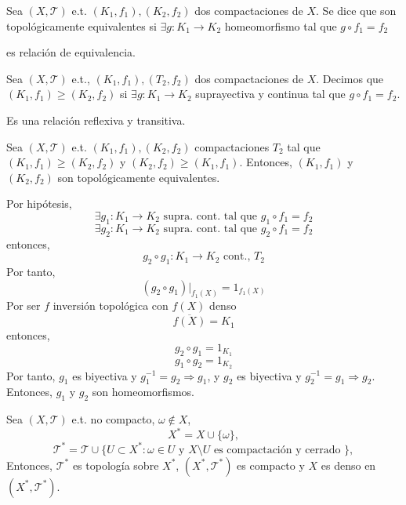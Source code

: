 \begin{defn}
  Sea $( X, \mathcal{T} )$ e.t. $( K_{1}, f_{1} ), ( K_{2}, f_{2} )$ dos compactaciones de $X$. Se dice que son topológicamente equivalentes si $\exists g : K_{1} \to K_{2}$ homeomorfismo tal que $g \circ f_{1} = f_{2}$
\end{defn}

\begin{obs}
  es relación de equivalencia.
\end{obs}

\begin{defn}
  Sea $( X, \mathcal{T} )$ e.t., $( K_{1}, f_{1} ), ( T_{2}, f_{2} )$ dos compactaciones de $X$. Decimos que $( K_{1}, f_{1} ) \geq ( K_{2}, f_{2} )$ si $\exists g : K_{1} \to K_{2}$ suprayectiva y continua tal que $g \circ f_{1} = f_{2}$. 
\end{defn}

\begin{obs}
  Es una relación reflexiva y transitiva.
\end{obs}

\begin{prop}
  Sea $( X, \mathcal{T} )$ e.t. $( K_{1}, f_{1} ), ( K_{2}, f_{2} )$ compactaciones $T_{2}$ tal que $( K_{1}, f_{1} ) \geq ( K_{2}, f_{2} )$ y $( K_{2}, f_{2} ) \geq ( K_{1}, f_{1} )$. Entonces, $( K_{1}, f_{1} )$ y $( K_{2}, f_{2} )$ son topológicamente equivalentes.
\end{prop}

\begin{dem}
  Por hipótesis,
  \[ 
    \exists g_{1} : K_{1} \to K_{2} \text{ supra. cont. tal que } g_{1} \circ f_{1} = f_{2}
  \] 
  \[ 
    \exists g_{2} : K_{1} \to K_{2} \text{ supra. cont. tal que } g_{2} \circ f_{1} = f_{2}
  \] 
  entonces,
  \[ 
    g_{2} \circ g_{1} : K_{1} \to K_{2} \text{ cont., } T_{2}  
  \] 
  Por tanto,
  \[ 
    (g_{2} \circ g_{1})|_{f_{1}(X)} = 1_{f_{1}(X)} 
  \] 
  Por ser $f$ inversión topológica con $f(X)$ denso
  \[ 
    \overline{f(X)} = K_{1} 
  \] 
  entonces,
  \[ 
    g_{2} \circ g_{1} = 1_{K_{1}} 
  \] 
  \[ 
    g_{1} \circ g_{2} = 1_{K_{2}} 
  \] 
  Por tanto, $g_{1}$ es biyectiva y $g_{1}^{-1} = g_{2} \Rightarrow g_{1}$, y $g_{2}$ es biyectiva y $g_{2}^{-1} = g_{1} \Rightarrow g_{2}$. Entonces, $g_{1}$ y $g_{2}$ son homeomorfismos.
\end{dem}

\begin{theo}[Alessandroff]
  Sea $( X, \mathcal{T} )$ e.t. no compacto, $\omega \not \in X$,
  \[
    X^* = X \cup \{ \omega \},
  \]
  \[
    \mathcal{T}^* = \mathcal{T} \cup \{ U \subset X^* : \omega \in U \text{ y } X \setminus U \text{ es compactación y cerrado } \},
  \]
  Entonces, $\mathcal{T}^*$ es topología sobre $ X^*$, $( X^*, \mathcal{T}^* )$ es compacto y $X$ es denso en $( X^*, \mathcal{T}^* )$.
\end{theo}

